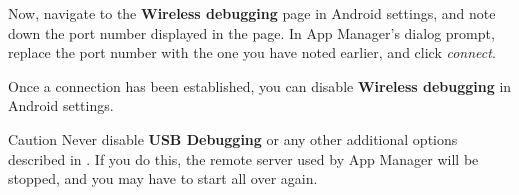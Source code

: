 Now, navigate to the \textbf{Wireless debugging} page in Android settings, and note down the port
number displayed in the page. In App Manager's dialog prompt, replace the port number with the one
you have noted earlier, and click \textit{connect}.

Once a connection has been established, you can disable \textbf{Wireless debugging} in Android settings.

\begin{danger}{Caution}
    Never disable \textbf{USB Debugging} or any other additional options described in .
    If you do this, the remote server used by App Manager will be stopped, and you may have to start all over again.
\end{danger}
